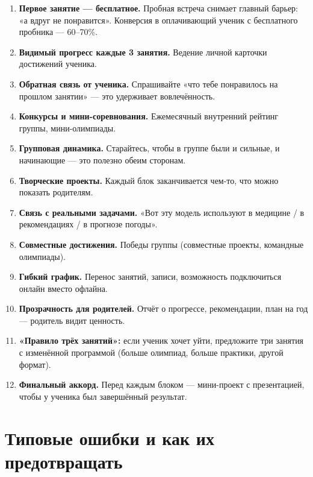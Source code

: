 \documentclass[12pt,a4paper]{article}
\begin{document}
\begin{enumerate}
  \item \textbf{Первое занятие --- бесплатное.} Пробная встреча снимает
  главный барьер: «а вдруг не понравится». Конверсия в оплачивающий
  ученик с бесплатного пробника --- 60--70\%.
  \item \textbf{Видимый прогресс каждые 3 занятия.} Ведение
  личной карточки достижений ученика.
  \item \textbf{Обратная связь от ученика.} Спрашивайте
  «что тебе понравилось на прошлом занятии» --- это удерживает
  вовлечённость.
  \item \textbf{Конкурсы и мини-соревнования.} Ежемесячный
  внутренний рейтинг группы, мини-олимпиады.
  \item \textbf{Групповая динамика.} Старайтесь, чтобы в группе
  были и сильные, и начинающие --- это полезно обеим сторонам.
  \item \textbf{Творческие проекты.} Каждый блок заканчивается
  чем-то, что можно показать родителям.
  \item \textbf{Связь с реальными задачами.} «Вот эту модель
  используют в медицине / в рекомендациях / в прогнозе погоды».
  \item \textbf{Совместные достижения.} Победы группы
  (совместные проекты, командные олимпиады).
  \item \textbf{Гибкий график.} Перенос занятий, записи,
  возможность подключиться онлайн вместо офлайна.
  \item \textbf{Прозрачность для родителей.} Отчёт о прогрессе,
  рекомендации, план на год --- родитель видит ценность.
  \item \textbf{«Правило трёх занятий»:} если ученик хочет уйти,
  предложите три занятия с изменённой программой
  (больше олимпиад, больше практики, другой формат).
  \item \textbf{Финальный аккорд.} Перед каждым блоком --- мини-проект
  с презентацией, чтобы у ученика был завершённый результат.
\end{enumerate}

\section{Типовые ошибки и как их предотвращать}
\end{document}
